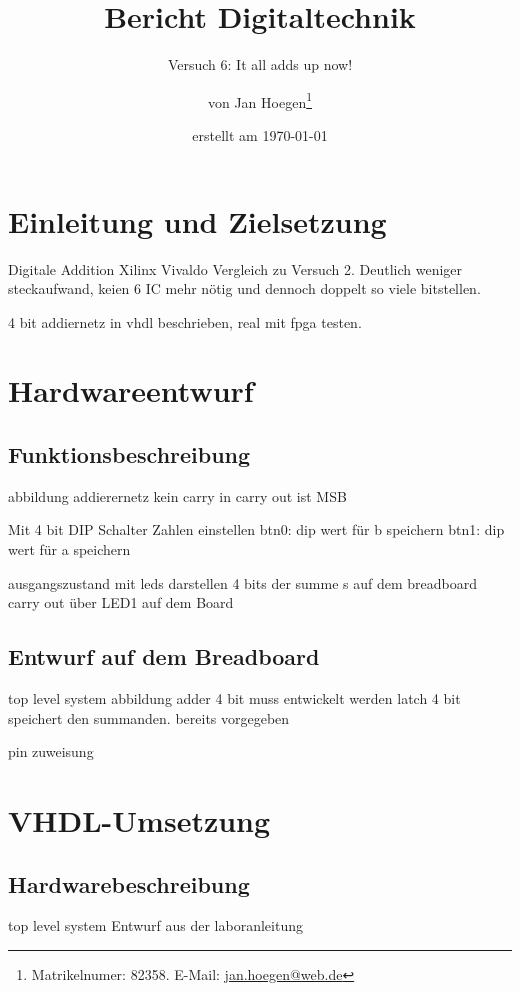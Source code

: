 \documentclass[
    paper=a4,
    parskip=half,
]{scrreprt}
\title{Bericht Digitaltechnik}
\subtitle{Versuch 6: It all adds up now!}
\author{von Jan Hoegen\thanks{Matrikelnumer: 82358. E-Mail: \href{mailto:jan.hoegen@web.de}{jan.hoegen@web.de}}}
\date{erstellt am \today}
\begin{document}
\maketitle

\tableofcontents


\chapter{Einleitung und Zielsetzung}   
    Digitale Addition
    Xilinx Vivaldo
    Vergleich zu Versuch 2. Deutlich weniger steckaufwand, keien 6 IC mehr nötig und dennoch doppelt so viele bitstellen.

    4 bit addiernetz in vhdl beschrieben, real mit fpga testen.

\chapter{Hardwareentwurf}

    \section{Funktionsbeschreibung}
    abbildung addierernetz
    kein carry in
    carry out ist MSB

    Mit 4 bit DIP Schalter Zahlen einstellen
    btn0: dip wert für b speichern
    btn1: dip wert für a speichern

    ausgangszustand mit leds darstellen
    4 bits der summe s auf dem breadboard
    carry out über LED1 auf dem Board
    
    \section{Entwurf auf dem Breadboard}
        top level system abbildung
        adder 4 bit muss entwickelt werden
        latch 4 bit speichert den summanden. bereits vorgegeben

        pin zuweisung

\chapter{VHDL-Umsetzung}

    \section{Hardwarebeschreibung}
        top level system Entwurf aus der laboranleitung
\end{document}
